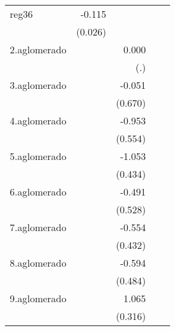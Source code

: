{\begin{longtable}{l*{4}{D{.}{.}{-1}}}
\addlinespace
reg36       &      -0.115\sym{***}&                     &                     &                     \\
            &     (0.026)         &                     &                     &                     \\
\addlinespace
2.aglomerado&                     &       0.000         &                     &                     \\
            &                     &         (.)         &                     &                     \\
\addlinespace
3.aglomerado&                     &      -0.051         &                     &                     \\
            &                     &     (0.670)         &                     &                     \\
\addlinespace
4.aglomerado&                     &      -0.953         &                     &                     \\
            &                     &     (0.554)         &                     &                     \\
\addlinespace
5.aglomerado&                     &      -1.053\sym{*}  &                     &                     \\
            &                     &     (0.434)         &                     &                     \\
\addlinespace
6.aglomerado&                     &      -0.491         &                     &                     \\
            &                     &     (0.528)         &                     &                     \\
\addlinespace
7.aglomerado&                     &      -0.554         &                     &                     \\
            &                     &     (0.432)         &                     &                     \\
\addlinespace
8.aglomerado&                     &      -0.594         &                     &                     \\
            &                     &     (0.484)         &                     &                     \\
\addlinespace
9.aglomerado&                     &       1.065\sym{***}&                     &                     \\
            &                     &     (0.316)         &                     &                     \\

\end{longtable}}
